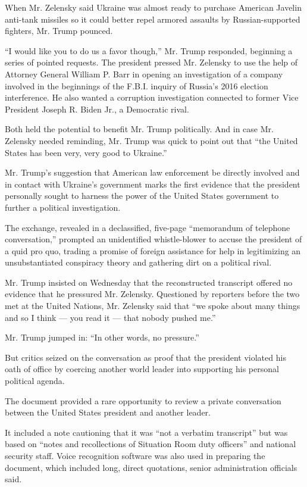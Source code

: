 When Mr. Zelensky said Ukraine was almost ready to purchase American
Javelin anti-tank missiles so it could better repel armored assaults by
Russian-supported fighters, Mr. Trump pounced.

``I would like you to do us a favor though,'' Mr. Trump responded,
beginning a series of pointed requests. The president pressed Mr.
Zelensky to use the help of Attorney General William P. Barr in opening
an investigation of a company involved in the beginnings of the F.B.I.
inquiry of Russia's 2016 election interference. He also wanted a
corruption investigation connected to former Vice President Joseph R.
Biden Jr., a Democratic rival.

Both held the potential to benefit Mr. Trump politically. And in case
Mr. Zelensky needed reminding, Mr. Trump was quick to point out that
``the United States has been very, very good to Ukraine.''

Mr. Trump's suggestion that American law enforcement be directly
involved and in contact with Ukraine's government marks the first
evidence that the president personally sought to harness the power of
the United States government to further a political investigation.

The exchange, revealed in a declassified, five-page ``memorandum of
telephone conversation,'' prompted an unidentified whistle-blower to
accuse the president of a quid pro quo, trading a promise of foreign
assistance for help in legitimizing an unsubstantiated conspiracy theory
and gathering dirt on a political rival.

Mr. Trump insisted on Wednesday that the reconstructed transcript
offered no evidence that he pressured Mr. Zelensky. Questioned by
reporters before the two met at the United Nations, Mr. Zelensky said
that ``we spoke about many things and so I think --- you read it ---
that nobody pushed me.''

Mr. Trump jumped in: ``In other words, no pressure.''

But critics seized on the conversation as proof that the president
violated his oath of office by coercing another world leader into
supporting his personal political agenda.

The document provided a rare opportunity to review a private
conversation between the United States president and another leader.

It included a note cautioning that it was ``not a verbatim transcript''
but was based on ``notes and recollections of Situation Room duty
officers'' and national security staff. Voice recognition software was
also used in preparing the document, which included long, direct
quotations, senior administration officials said.

